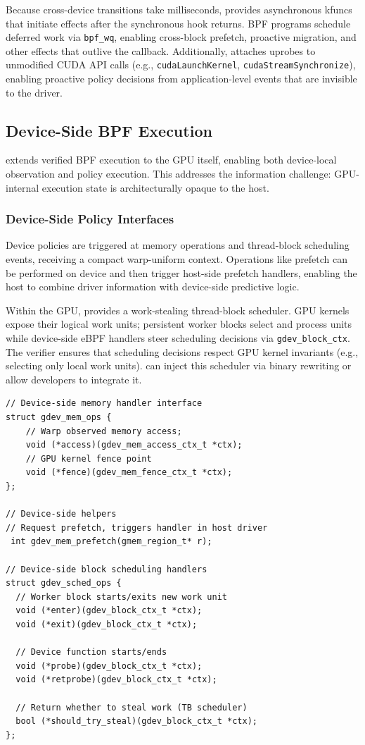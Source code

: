 Because cross-device transitions take milliseconds, \sys provides asynchronous kfuncs that initiate effects after the synchronous hook returns. BPF programs schedule deferred work via \texttt{bpf\_wq}, enabling cross-block prefetch, proactive migration, and other effects that outlive the callback. Additionally, \sys attaches uprobes to unmodified CUDA API calls (e.g., \texttt{cudaLaunchKernel}, \texttt{cudaStreamSynchronize}), enabling proactive policy decisions from application-level events that are invisible to the driver.


\subsection{Device-Side BPF Execution}
\label{sec:verification}

\sys extends verified BPF execution to the GPU itself, enabling both device-local observation and policy execution. This addresses the information challenge: GPU-internal execution state is architecturally opaque to the host.

\subsubsection{Device-Side Policy Interfaces}

Device policies are triggered at memory operations and thread-block scheduling events, receiving a compact warp-uniform context. Operations like prefetch can be performed on device and then trigger host-side prefetch handlers, enabling the host to combine driver information with device-side predictive logic.

Within the GPU, \sys provides a work-stealing thread-block scheduler. GPU kernels expose their logical work units; persistent worker blocks select and process units while device-side eBPF handlers steer scheduling decisions via \texttt{gdev\_block\_ctx}. The verifier ensures that scheduling decisions respect GPU kernel invariants (e.g., selecting only local work units). \sys can inject this scheduler via binary rewriting or allow developers to integrate it.

\begin{lstlisting}
// Device-side memory handler interface
struct gdev_mem_ops {
    // Warp observed memory access;
    void (*access)(gdev_mem_access_ctx_t *ctx);
    // GPU kernel fence point
    void (*fence)(gdev_mem_fence_ctx_t *ctx);
};

// Device-side helpers
// Request prefetch, triggers handler in host driver
 int gdev_mem_prefetch(gmem_region_t* r);

// Device-side block scheduling handlers
struct gdev_sched_ops {
  // Worker block starts/exits new work unit
  void (*enter)(gdev_block_ctx_t *ctx);
  void (*exit)(gdev_block_ctx_t *ctx);

  // Device function starts/ends
  void (*probe)(gdev_block_ctx_t *ctx);
  void (*retprobe)(gdev_block_ctx_t *ctx);

  // Return whether to steal work (TB scheduler)
  bool (*should_try_steal)(gdev_block_ctx_t *ctx);
};
\end{lstlisting}

